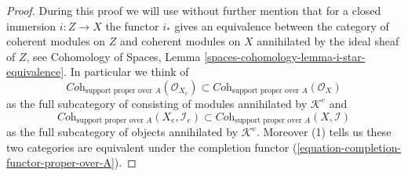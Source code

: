 \documentclass[10pt,a4paper]{amsart}
\theoremstyle{plain}
\theoremstyle{definition}
\theoremstyle{remark}
\numberwithin{equation}{subsection}
\begin{document}
\begin{proof}
During this proof we will use without further mention that for a closed
immersion $i : Z \to X$ the functor $i_*$ gives an equivalence between the
category of coherent modules on $Z$ and coherent modules on $X$ annihilated
by the ideal sheaf of $Z$, see
Cohomology of Spaces, Lemma \ref{spaces-cohomology-lemma-i-star-equivalence}.
In particular we think of
$$
\textit{Coh}_{\text{support proper over } A}(\mathcal{O}_{X_e})
\subset
\textit{Coh}_{\text{support proper over } A}(\mathcal{O}_X)
$$
as the full subcategory of consisting of modules annihilated by
$\mathcal{K}^e$ and
$$
\textit{Coh}_{\text{support proper over } A}(X_e, \mathcal{I}_e)
\subset
\textit{Coh}_{\text{support proper over } A}(X, \mathcal{I})
$$
as the full subcategory of objects annihilated by $\mathcal{K}^e$.
Moreover (1) tells us these two categories are equivalent under the
completion functor (\ref{equation-completion-functor-proper-over-A}).


\end{proof}
\end{document}
